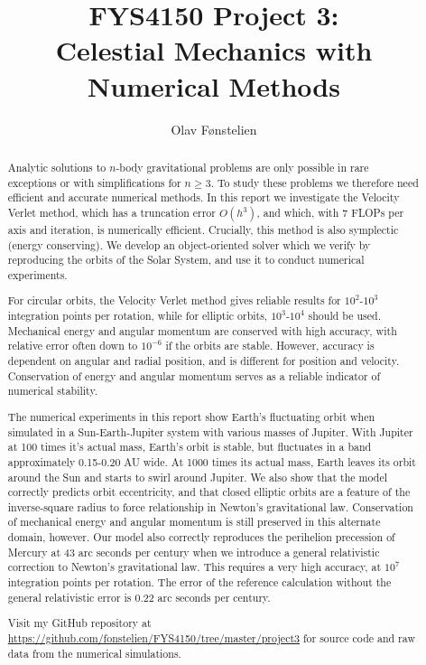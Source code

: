 \documentclass[]{article}
\title{FYS4150 Project 3:\\Celestial Mechanics with Numerical Methods}
\author{Olav Fønstelien}
\begin{document}
\maketitle

\begin{abstract}
Analytic solutions to $n$-body gravitational problems are only possible in rare exceptions or with simplifications for $n \ge 3$. To study these problems we therefore need efficient and accurate numerical methods. In this report we investigate the Velocity Verlet method, which has a truncation error $O(h^3)$, and which, with 7 FLOPs per axis and iteration, is numerically efficient. Crucially, this method is also symplectic (energy conserving). We develop an object-oriented solver which we verify by reproducing the orbits of the Solar System, and use it to conduct numerical experiments. 

For circular orbits, the Velocity Verlet method gives reliable results for $10^2$-$10^3$ integration points per rotation, while for elliptic orbits, $10^3$-$10^4$ should be used. Mechanical energy and angular momentum are conserved with high accuracy, with relative error often down to $10^{-6}$ if the orbits are stable. However, accuracy is dependent on angular and radial position, and is different for position and velocity. Conservation of energy and angular momentum serves as a reliable indicator of numerical stability.

The numerical experiments in this report show Earth's fluctuating orbit when simulated in a Sun-Earth-Jupiter system with various masses of Jupiter. With Jupiter at 100 times it's actual mass, Earth's orbit is stable, but fluctuates in a band approximately 0.15-0.20 AU wide. At 1000 times its actual mass, Earth leaves its orbit around the Sun and starts to swirl around Jupiter. We also show that the model correctly predicts orbit eccentricity, and that closed elliptic orbits are a feature of the inverse-square radius to force relationship in Newton's gravitational law. Conservation of mechanical energy and angular momentum is still preserved in this alternate domain, however. Our model also correctly reproduces the perihelion precession of Mercury at 43 arc seconds per century when we introduce a general relativistic correction to Newton's gravitational law. This requires a very high accuracy, at $10^7$ integration points per rotation. The error of the reference calculation without the general relativistic error is 0.22 arc seconds per century.

Visit my GitHub repository at \url{https://github.com/fonstelien/FYS4150/tree/master/project3} for source code and raw data from the numerical simulations.
\end{abstract}
\end{document}
